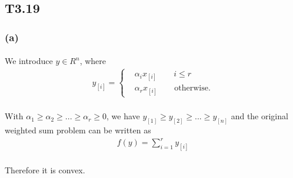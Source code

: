 \subsection*{T3.19}
\subsubsection*{(a)}
\paragraph{}
We introduce $y\in R^n$, where
\begin{align*}
	y_{[i]} =\begin{cases}
	&\alpha_i x_{[i]} \qquad i \leq r\\
	&\alpha_r x_{[i]} \qquad \text{otherwise}.
	\end{cases}
\end{align*}
\paragraph{}
With $\alpha_1 \geq \alpha_2 \geq ...\geq \alpha_r \geq 0$, we have $y_{[1]} \geq y_{[2]} \geq ...\geq y_{[n]}$ and the original weighted sum problem can be written as
\begin{align*}
f(y) = \sum_{i=1}^r y_{[i]}
\end{align*}
\paragraph{}
Therefore it is convex.
